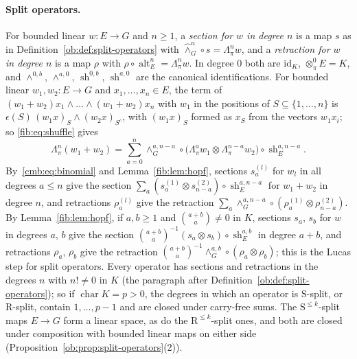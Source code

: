 \documentclass[11pt]{amsart}
\theoremstyle{definition}
\theoremstyle{remark}
\numberwithin{equation}{section}
\newcommand{\id}{\mathrm{id}}
\theoremstyle{plain}
\theoremstyle{definition}
\theoremstyle{plain}
\newcommand{\alt}{\operatorname{alt}}
\begin{document}
\paragraph{Split operators.}
For bounded linear $w\colon E\to G$ and $n\ge1$, a \emph{section for $w$ in degree $n$} is a map $s$ as in
Definition~\ref{ob:def:split-operators} with $\widehat\wedge^n_G\circ s=\Lambda^n_\pi w$, and a \emph{retraction for $w$
in degree $n$} is a map $\rho$ with $\rho\circ\alt^n_E=\Lambda^n_\pi w$. In degree $0$ both are $\id_K$,
$\otimes^0_\pi E=K$, and $\wedge^{0,b}$, $\wedge^{a,0}$, $\operatorname{sh}^{0,b}$, $\operatorname{sh}^{a,0}$ are the
canonical identifications. For bounded linear $w_1,w_2\colon E\to G$ and $x_1,\dots,x_n\in E$, the term of
$(w_1+w_2)x_1\wedge\dots\wedge(w_1+w_2)x_n$ with $w_1$ in the positions of $S\subseteq\{1,\dots,n\}$ is
$\epsilon(S)\,(w_1x)_S\wedge(w_2x)_{S^c}$, with $(w_1x)_S$ formed as $x_S$ from the vectors $w_1x_i$; so
\eqref{fib:eq:shuffle} gives
\begin{equation}\label{cmb:eq:binomial}
 \Lambda^n_\pi(w_1+w_2)=\sum_{a=0}^n\wedge^{a,n-a}_G\circ\bigl(\Lambda^a_\pi w_1\otimes\Lambda^{n-a}_\pi w_2\bigr)\circ
 \operatorname{sh}^{a,n-a}_E .
\end{equation}
By~\eqref{cmb:eq:binomial} and Lemma~\ref{fib:lem:hopf}, sections $s^{(l)}_a$ for $w_l$ in all degrees $a\le n$ give the
section $\sum_a(s^{(1)}_a\otimes s^{(2)}_{n-a})\circ\operatorname{sh}^{a,n-a}_E$ for $w_1+w_2$ in degree $n$, and
retractions $\rho^{(l)}_a$ give the retraction $\sum_a\wedge^{a,n-a}_G\circ(\rho^{(1)}_a\otimes\rho^{(2)}_{n-a})$. By
Lemma~\ref{fib:lem:hopf}, if $a,b\ge1$ and $\binom{a+b}a\ne0$ in $K$, sections $s_a$, $s_b$ for $w$ in degrees $a$, $b$
give the section $\binom{a+b}a^{-1}(s_a\otimes s_b)\circ\operatorname{sh}^{a,b}_E$ in degree $a+b$, and retractions
$\rho_a$, $\rho_b$ give the retraction $\binom{a+b}a^{-1}\wedge^{a,b}_G\circ(\rho_a\otimes\rho_b)$; this is the Lucas step
for split operators. Every operator has sections and retractions in the degrees $n$ with $n!\ne0$ in $K$ (the paragraph
after Definition~\ref{ob:def:split-operators}); so if $\operatorname{char}K=p>0$, the degrees in which an operator is
$\mathrm S$-split, or $\mathrm R$-split, contain $1,\dots,p-1$ and are closed under carry-free sums. The
$\mathrm S^{\le k}$-split maps $E\to G$ form a linear space, as do the $\mathrm R^{\le k}$-split ones, and both are closed
under composition with bounded linear maps on either side (Proposition~\ref{ob:prop:split-operators}(2)).
\end{document}
